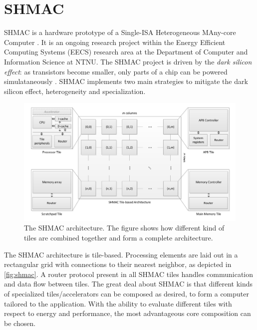 \section{SHMAC}

SHMAC is a hardware prototype of a Single-ISA Heterogeneous MAny-core Computer
\cite{shmacsliedes, shmacwebpage, Rusten567042}. It is an ongoing research
project within the Energy Efficient Computing Systems (EECS) research area at
the Department of Computer and Information Science at NTNU. The SHMAC project is
driven by the \textit{dark silicon effect}: as transistors become smaller, only
parts of a chip can be powered simulataneously \cite{esmaeilzadeh2011dark}.
SHMAC implements two main strategies to mitigate the dark silicon effect,
heterogeneity and specialization.

\begin{figure}
    \centering
    \includegraphics[width=1.0\textwidth]{figs/shmac-high-level2.png}
    \caption{The SHMAC architecture. The figure shows how different kind of
    tiles are combined together and form a complete architecture.}
    \label{fig:shmac}
\end{figure}

The SHMAC architecture is tile-based. Processing elements are laid out in a
rectangular grid with connections to their nearest neighbor, as depicted in
\autoref{fig:shmac}. A router protocol present in all SHMAC tiles handles
communication and data flow between tiles. The great deal about SHMAC is that
different kinds of specialized tiles/accelerators can be composed as desired, to
form a computer tailored to the application. With the ability to evaluate
different tiles with respect to energy and performance, the most advantageous
core composition can be chosen.
